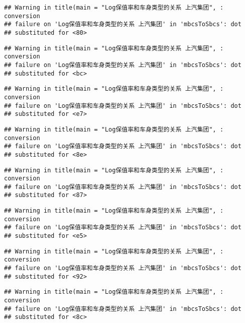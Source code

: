 \documentclass[]{article}
\begin{document}
\begin{verbatim}
## Warning in title(main = "Log保值率和车身类型的关系 上汽集团", : conversion
## failure on 'Log保值率和车身类型的关系 上汽集团' in 'mbcsToSbcs': dot
## substituted for <80>
\end{verbatim}

\begin{verbatim}
## Warning in title(main = "Log保值率和车身类型的关系 上汽集团", : conversion
## failure on 'Log保值率和车身类型的关系 上汽集团' in 'mbcsToSbcs': dot
## substituted for <bc>
\end{verbatim}

\begin{verbatim}
## Warning in title(main = "Log保值率和车身类型的关系 上汽集团", : conversion
## failure on 'Log保值率和车身类型的关系 上汽集团' in 'mbcsToSbcs': dot
## substituted for <e7>
\end{verbatim}

\begin{verbatim}
## Warning in title(main = "Log保值率和车身类型的关系 上汽集团", : conversion
## failure on 'Log保值率和车身类型的关系 上汽集团' in 'mbcsToSbcs': dot
## substituted for <8e>
\end{verbatim}

\begin{verbatim}
## Warning in title(main = "Log保值率和车身类型的关系 上汽集团", : conversion
## failure on 'Log保值率和车身类型的关系 上汽集团' in 'mbcsToSbcs': dot
## substituted for <87>
\end{verbatim}

\begin{verbatim}
## Warning in title(main = "Log保值率和车身类型的关系 上汽集团", : conversion
## failure on 'Log保值率和车身类型的关系 上汽集团' in 'mbcsToSbcs': dot
## substituted for <e5>
\end{verbatim}

\begin{verbatim}
## Warning in title(main = "Log保值率和车身类型的关系 上汽集团", : conversion
## failure on 'Log保值率和车身类型的关系 上汽集团' in 'mbcsToSbcs': dot
## substituted for <92>
\end{verbatim}

\begin{verbatim}
## Warning in title(main = "Log保值率和车身类型的关系 上汽集团", : conversion
## failure on 'Log保值率和车身类型的关系 上汽集团' in 'mbcsToSbcs': dot
## substituted for <8c>
\end{verbatim}
\end{document}

